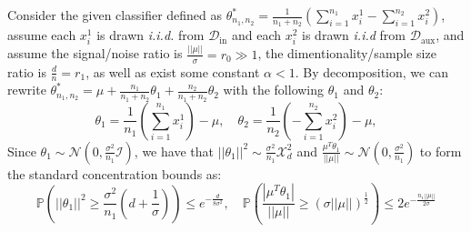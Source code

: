 \documentclass{article}
\theoremstyle{plain}
\theoremstyle{definition}
\theoremstyle{remark}
\begin{document}
Consider the given classifier defined as $\theta^*_{n_1,n_2}=\frac{1}{n_1+n_2}(\sum_{i=1}^{n_1} x_i^1-\sum_{i=1}^{n_2} x_i^2)$, assume each $x_i^1$ is drawn \textit{i.i.d.} from $\mathcal{D}_\text{in}$ and each $x_i^2$ is drawn \textit{i.i.d} from $\mathcal{D}_\text{aux}$, and assume the signal/noise ratio is $\frac{||\mu||}{\sigma}=r_0\gg 1$, the dimentionality/sample size ratio is $\frac{d}{n}=r_1$, as well as exist some constant $\alpha<1$. By decomposition, we can rewrite $\theta^*_{n_1,n_2}=\mu+\frac{n_1}{n_1+n_2}\theta_\text{1}+\frac{n_2}{n_1+n_2}\theta_\text{2}$ with the following $\theta_\text{1}$ and $\theta_\text{2}$:
\begin{equation}
\label{eq:theta_decomp}
    \theta_\text{1} = \frac{1}{n_1}(\sum_{i=1}^{n_1}x_i^1)-\mu,\quad \theta_\text{2} = \frac{1}{n_2}(-\sum_{i=1}^{n_2}x_i^2)-\mu,
\end{equation}
Since $\theta_\text{1} \sim \mathcal{N}(0, \frac{\sigma^2}{n_1}\mathcal{I})$, we have that $||\theta_1||^2\sim\frac{\sigma^2}{n_1}\mathcal{X}_d^2$ and $\frac{\mu^T\theta_1}{||\mu||}\sim\mathcal{N}(0, \frac{\sigma^2}{n_1})$ to form the standard concentration bounds as:
\begin{equation}
\label{eq:concentration}
    \mathbb{P}(||\theta_1||^2\geq\frac{\sigma^2}{n_1}(d+\frac{1}{\sigma}))\leq e^{-\frac{d}{8\sigma^2}},\quad \mathbb{P}(\frac{|\mu^T\theta_1|}{||\mu||}\geq(\sigma||\mu||)^{\frac{1}{2}})\leq 2e^{-\frac{n_1||\mu||}{2\sigma}}
\end{equation}
\end{document}
